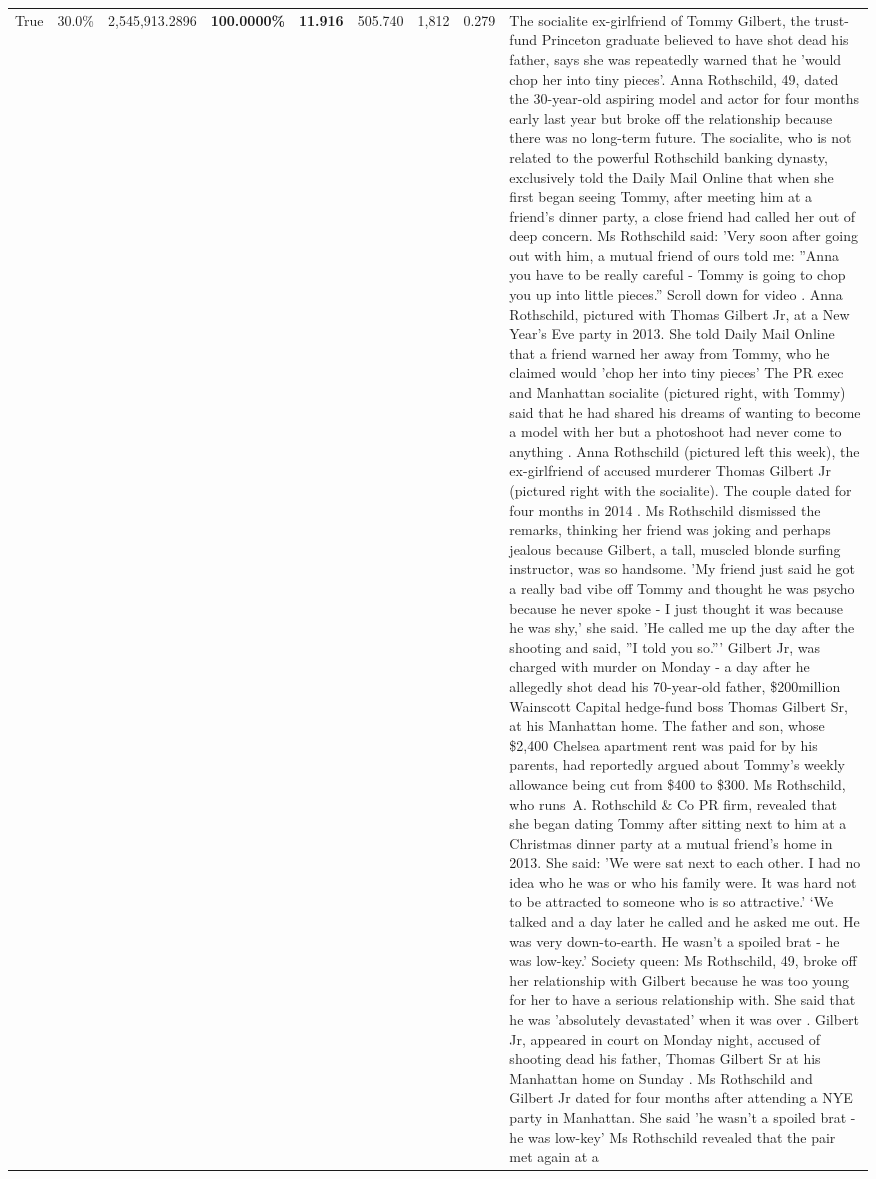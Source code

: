 \begin{table}[H]
\begin{tabular}{lllrlllll}
True & 30.0\% & 2,545,913.2896 & \bfseries \color{red} 100.0000\% & \bfseries \color{red} 11.916 & 505.740 & 1,812 & 0.279 & The socialite ex-girlfriend of Tommy Gilbert, the trust-fund Princeton graduate believed to have shot dead his father, says she was repeatedly warned that he 'would chop her into tiny pieces'. Anna Rothschild, 49, dated the 30-year-old aspiring model and actor for four months early last year but broke off the relationship because there was no long-term future. The socialite, who is not related to the powerful Rothschild banking dynasty, exclusively told the Daily Mail Online that when she first began seeing Tommy, after meeting him at a friend's dinner party, a close friend had called her out of deep concern. Ms Rothschild said: 'Very soon after going out with him, a mutual friend of ours told me: ''Anna you have to be really careful - Tommy is going to chop you up into little pieces.'' Scroll down for video . Anna Rothschild, pictured with Thomas Gilbert Jr, at a New Year's Eve party in 2013. She told Daily Mail Online that a friend warned her away from Tommy, who he claimed would 'chop her into tiny pieces' The PR exec and Manhattan socialite (pictured right, with Tommy) said that he had shared his dreams of wanting to become a model with her but a photoshoot had never come to anything . Anna Rothschild (pictured left this week), the ex-girlfriend of accused murderer Thomas Gilbert Jr (pictured right with the socialite). The couple dated for four months in 2014 . Ms Rothschild dismissed the remarks, thinking her friend was joking and perhaps jealous because Gilbert, a tall, muscled blonde surfing instructor, was so handsome. 'My friend just said he got a really bad vibe off Tommy and thought he was psycho because he never spoke - I just thought it was because he was shy,' she said. 'He called me up the day after the shooting and said, ''I told you so.''' Gilbert Jr, was charged with murder on Monday - a day after he allegedly shot dead his 70-year-old father, \$200million Wainscott Capital hedge-fund boss Thomas Gilbert Sr, at his Manhattan home. The father and son, whose \$2,400 Chelsea apartment rent was paid for by his parents, had reportedly argued about Tommy's weekly allowance being cut from \$400 to \$300. Ms Rothschild, who runs A. Rothschild \& Co PR firm, revealed that she began dating Tommy after sitting next to him at a Christmas dinner party at a mutual friend's home in 2013. She said: 'We were sat next to each other. I had no idea who he was or who his family were. It was hard not to be attracted to someone who is so attractive.' ‘We talked and a day later he called and he asked me out. He was very down-to-earth. He wasn’t a spoiled brat - he was low-key.’ Society queen: Ms Rothschild, 49, broke off her relationship with Gilbert because he was too young for her to have a serious relationship with. She said that he was 'absolutely devastated' when it was over . Gilbert Jr, appeared in court on Monday night, accused of shooting dead his father, Thomas Gilbert Sr at his Manhattan home on Sunday . Ms Rothschild and Gilbert Jr dated for four months after attending a NYE party in Manhattan. She said 'he wasn't a spoiled brat - he was low-key' Ms Rothschild revealed that the pair met again at a 
\end{tabular}
\end{table}
